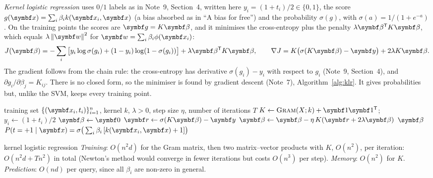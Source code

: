 \documentclass[11pt]{article}
\newcommand{\w}{\vect{w}}
\newcommand{\y}{\vect{y}}
\begin{document}
\emph{Kernel logistic regression} uses $0/1$ labels as in Note~9, Section~4, written here $y_i = (1 + t_i)/2 \in \{0, 1\}$, the score
$g(\x) = \sum_i \beta_i k(\x_i, \x)$ (a bias absorbed as in ``A bias for free'') and the probability $\sigma(g)$, with
$\sigma(a) = 1/(1 + e^{-a})$. On the training points the scores are $\vect{g} = K\vect{\beta}$, and it minimises the
cross-entropy plus the penalty $\lambda\vect{\beta}\T K\vect{\beta}$, which equals $\lambda\norm{\w}^2$ for
$\w = \sum_i\beta_i\phi(\x_i)$:
\[
  J(\vect{\beta}) = -\sum_i \big[y_i\log\sigma(g_i) + (1 - y_i)\log(1 - \sigma(g_i))\big] + \lambda\vect{\beta}\T K\vect{\beta} ,
  \qquad
  \nabla J = K\big(\sigma(K\vect{\beta}) - \y\big) + 2\lambda K\vect{\beta} .
\]
The gradient follows from the chain rule: the cross-entropy has derivative $\sigma(g_i) - y_i$ with respect to $g_i$
(Note~9, Section~4), and $\partial g_i/\partial\beta_j = K_{ij}$. There is no closed form, so the minimiser is found by
gradient descent (Note~7), Algorithm~\ref{alg:klr}. It gives probabilities but, unlike the SVM, keeps every training
point.

\begin{algorithm}[htbp]
\caption{Kernel logistic regression by gradient descent}\label{alg:klr}
\begin{algorithmic}[1]
\Require training set $\{(\x_i, t_i)\}_{i=1}^n$, kernel $k$, $\lambda > 0$, step size $\eta$, number of iterations $T$
  \State $K \gets \textsc{Gram}(X; k) + \vect{1}\vect{1}\T$; \ $y_i \gets (1 + t_i)/2$ 
  \State $\vect{\beta} \gets \vect{0}$
    \State $\vect{r} \gets \sigma(K\vect{\beta}) - \y$ 
    \State $\vect{\beta} \gets \vect{\beta} - \eta\, K(\vect{r} + 2\lambda\vect{\beta})$ 
  \EndFor
  \State \Return $\vect{\beta}$
\EndFunction
{}
  \State \Return $P(t = +1 \mid \x) = \sigma\big(\sum_i \beta_i\,[k(\x_i, \x) + 1]\big)$ 
\EndFunction
\end{algorithmic}
\end{algorithm}

\begin{runtime}{kernel logistic regression}
\emph{Training}: $O(n^2 d)$ for the Gram matrix, then two matrix--vector products with $K$, $O(n^2)$, per iteration:
$O(n^2 d + Tn^2)$ in total (Newton's method would converge in fewer iterations but costs $O(n^3)$ per step).
\emph{Memory}: $O(n^2)$ for $K$. \emph{Prediction}: $O(nd)$ per query, since all $\beta_i$ are non-zero in general.
\end{runtime}
\end{document}
